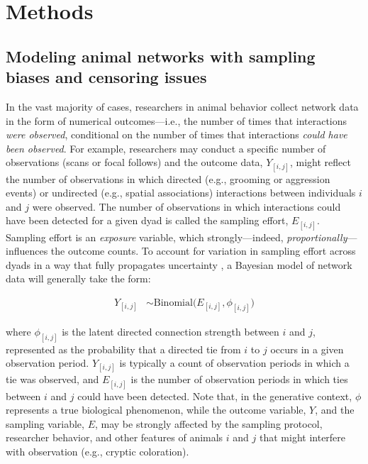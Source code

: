 \documentclass[Afour,sageh,times]{sagej}
\begin{document}
\section{Methods}

\subsection{Modeling animal networks with sampling biases and censoring issues}
In the vast majority of cases, researchers in animal behavior  collect network data in the form of numerical outcomes---i.e., the number of times that interactions \emph{were observed}, conditional on the number of times that interactions \emph{could have been observed}. For example, researchers may conduct a specific number of observations (scans or focal follows) and the outcome data, $Y_{[i,j]}$, might reflect the number of observations in which directed (e.g., grooming or aggression events) or undirected (e.g., spatial associations) interactions between individuals $i$ and $j$ were observed. The number of observations in which interactions could have been detected for a given dyad is called the sampling effort, $E_{[i,j]}$. Sampling effort is an \emph{exposure} variable, which strongly---indeed, \emph{proportionally}---influences the outcome counts. To account for variation in sampling effort across dyads in a way that fully propagates uncertainty \citep[see][for derivation]{ross2022modelling}, a Bayesian model of network data will generally take the form:  

\begin{ceqn}
\begin{align}\label{maineq}
	Y_{[i,j]} &\sim \mathrm{Binomial}\Big(E_{[i,j]}, \phi_{[i,j]} \Big)
\end{align}
\end{ceqn}
where $\phi_{[i,j]}$ is the latent directed connection strength between $i$ and $j$, represented as the probability that a directed tie from $i$ to $j$ occurs in a given observation period. 
$Y_{[i,j]}$ is typically a count of observation periods in which a tie was observed, and $E_{[i,j]}$ is the number of observation periods in which ties between $i$ and $j$ could have been detected. Note that, in the generative context, $\phi$ represents a true biological phenomenon, while the outcome variable, $Y$, and the sampling variable, $E$, may be strongly affected by the sampling protocol, researcher behavior, and other features of animals $i$ and $j$ that might interfere with observation (e.g., cryptic coloration). 
\end{document}
